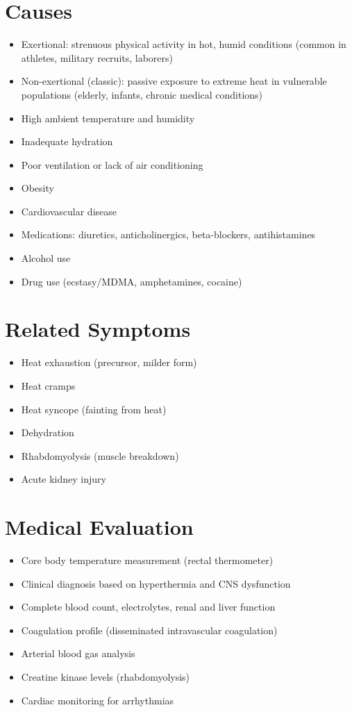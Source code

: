 \section*{Causes}
\begin{itemize}
\item Exertional: strenuous physical activity in hot, humid conditions (common in athletes, military recruits, laborers)
\item Non-exertional (classic): passive exposure to extreme heat in vulnerable populations (elderly, infants, chronic medical conditions)
\item High ambient temperature and humidity
\item Inadequate hydration
\item Poor ventilation or lack of air conditioning
\item Obesity
\item Cardiovascular disease
\item Medications: diuretics, anticholinergics, beta-blockers, antihistamines
\item Alcohol use
\item Drug use (ecstasy/MDMA, amphetamines, cocaine)
\end{itemize}

\section*{Related Symptoms}
\begin{itemize}
\item Heat exhaustion (precursor, milder form)
\item Heat cramps
\item Heat syncope (fainting from heat)
\item Dehydration
\item Rhabdomyolysis (muscle breakdown)
\item Acute kidney injury
\end{itemize}

\section*{Medical Evaluation}
\begin{itemize}
\item Core body temperature measurement (rectal thermometer)
\item Clinical diagnosis based on hyperthermia and CNS dysfunction
\item Complete blood count, electrolytes, renal and liver function
\item Coagulation profile (disseminated intravascular coagulation)
\item Arterial blood gas analysis
\item Creatine kinase levels (rhabdomyolysis)
\item Cardiac monitoring for arrhythmias
\end{itemize}

